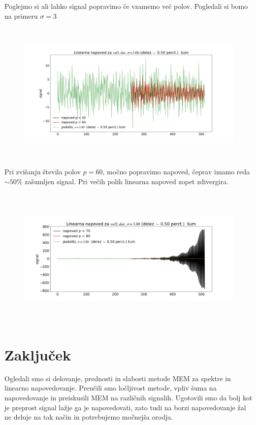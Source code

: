 \documentclass[11pt, a4paper]{article}
\begin{document}
Poglejmo si ali lahko signal popravimo če vzamemo več polov. Pogledali si bomo na primeru $\sigma = 3$
\begin{figure}[H]
\centering

    \includegraphics[width=16cm,height=7cm]{zadnja6.png}
   

\end{figure}
Pri zvišanju števila polov  $p=60$, močno popravimo napoved, čeprav imamo reda $\sim 50\%$ zašumljen signal. Pri večih polih linearna napoved zopet zdivergira.
\begin{figure}[H]
\centering

    \includegraphics[width=16cm,height=7cm]{divergira2.png}
   

\end{figure}
\section{Zaključek}
Ogledali smo si delovanje, prednosti in slabosti metode MEM za spektre in linearno napovedovanje. Preučili smo ločljivost metode, vpliv šuma na napovedovanje in preiskusili MEM na različnih signalih. Ugotovili smo da bolj kot je preprost signal lažje ga je napovedovati, zato tudi na borzi napovedovanje žal ne deluje na tak način in potrebujemo močnejša orodja.
\end{document}
